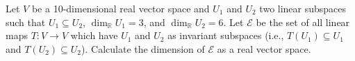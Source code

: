 \documentclass{article}
\begin{document}
	\setlength{\parindent}{0pt}
	Let $V$ be a 10-dimensional real vector space and $U_1$ and $U_2$ two linear subspaces such that $U_1\subseteq U_2$, $\dim_\mathbb{R} U_1=3$, and $\dim_\mathbb{R} U_2=6$. Let $\mathcal{E}$ be the set of all linear maps $T:V\to V$ which have $U_1$ and $U_2$ as invariant subspaces (i.e., $T(U_1)\subseteq U_1$ and $T(U_2)\subseteq U_2$). Calculate the dimension of $\mathcal{E}$ as a real vector space.
\end{document}
